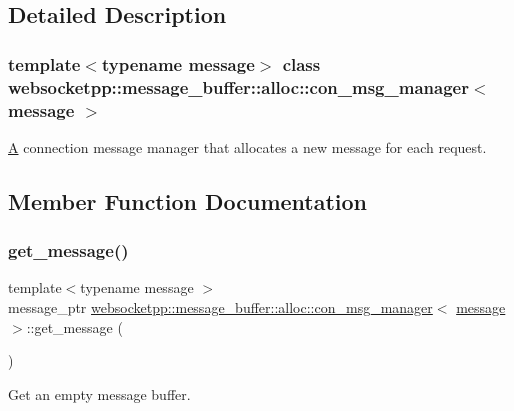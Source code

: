 \subsection{Detailed Description}
\subsubsection*{template$<$typename message$>$\newline
class websocketpp\+::message\+\_\+buffer\+::alloc\+::con\+\_\+msg\+\_\+manager$<$ message $>$}

\mbox{\hyperlink{struct_a}{A}} connection message manager that allocates a new message for each request. 

\subsection{Member Function Documentation}
\mbox{\label{classwebsocketpp_1_1message__buffer_1_1alloc_1_1con__msg__manager_ab37990d12c3d54f6963df6b0ddadcf28}} 
\subsubsection{\texorpdfstring{get\+\_\+message()}{get\_message()}\hspace{0.1cm}{\footnotesize\ttfamily [1/3]}}
{\footnotesize\ttfamily template$<$typename message $>$ \\
message\+\_\+ptr \mbox{\hyperlink{classwebsocketpp_1_1message__buffer_1_1alloc_1_1con__msg__manager}{websocketpp\+::message\+\_\+buffer\+::alloc\+::con\+\_\+msg\+\_\+manager}}$<$ \mbox{\hyperlink{classwebsocketpp_1_1message__buffer_1_1message}{message}} $>$\+::get\+\_\+message (\begin{DoxyParamCaption}{ }\end{DoxyParamCaption})\hspace{0.3cm}{\ttfamily [inline]}}



Get an empty message buffer. 

